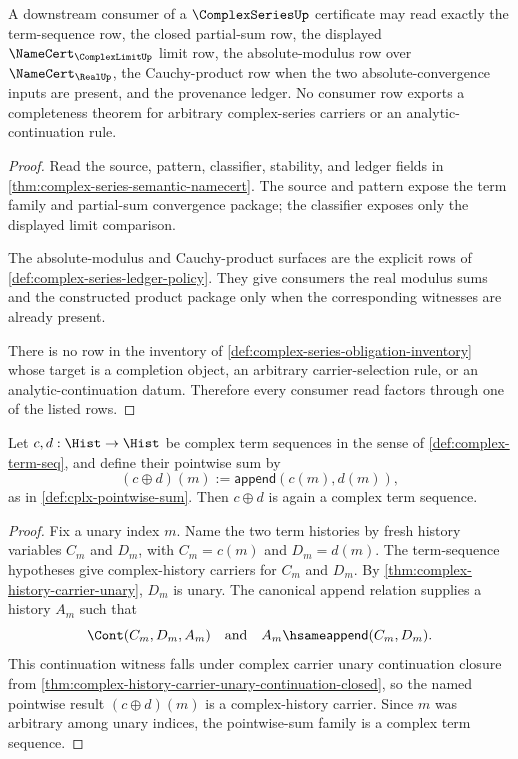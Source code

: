 \begin{theorem}
\label{thm:complex-series-downstream-consumer-boundary}
A downstream consumer of a $\ComplexSeriesUp$ certificate may read exactly the term-sequence row, the closed partial-sum row, the displayed $\NameCert_{\ComplexLimitUp}$ limit row, the absolute-modulus row over $\NameCert_{\RealUp}$, the Cauchy-product row when the two absolute-convergence inputs are present, and the provenance ledger. No consumer row exports a completeness theorem for arbitrary complex-series carriers or an analytic-continuation rule.
\end{theorem}
\begin{proof}
Read the source, pattern, classifier, stability, and ledger fields in \autoref{thm:complex-series-semantic-namecert}. The source and pattern expose the term family and partial-sum convergence package; the classifier exposes only the displayed limit comparison.

The absolute-modulus and Cauchy-product surfaces are the explicit rows of \autoref{def:complex-series-ledger-policy}. They give consumers the real modulus sums and the constructed product package only when the corresponding witnesses are already present.

There is no row in the inventory of \autoref{def:complex-series-obligation-inventory} whose target is a completion object, an arbitrary carrier-selection rule, or an analytic-continuation datum. Therefore every consumer read factors through one of the listed rows.
\end{proof}

\begin{lemma}
\label{lem:complex-term-seq-pointwise-addition}
Let $c,d:\Hist\to\Hist$ be complex term sequences in the sense of \autoref{def:complex-term-seq}, and define their pointwise sum by
$$
(c\oplus d)(m):=\mathsf{append}(c(m),d(m)),
$$
as in \autoref{def:cplx-pointwise-sum}. Then $c\oplus d$ is again a complex term sequence.
\end{lemma}
\begin{proof}
Fix a unary index $m$. Name the two term histories by fresh history variables $C_m$ and $D_m$, with $C_m=c(m)$ and $D_m=d(m)$. The term-sequence hypotheses give complex-history carriers for $C_m$ and $D_m$. By \autoref{thm:complex-history-carrier-unary}, $D_m$ is unary. The canonical append relation supplies a history $A_m$ such that
$$
\Cont(C_m,D_m,A_m)
\quad\text{and}\quad
A_m\hsame\mathsf{append}(C_m,D_m).
$$
This continuation witness falls under complex carrier unary continuation closure from \autoref{thm:complex-history-carrier-unary-continuation-closed}, so the named pointwise result $(c\oplus d)(m)$ is a complex-history carrier. Since $m$ was arbitrary among unary indices, the pointwise-sum family is a complex term sequence.
\end{proof}

